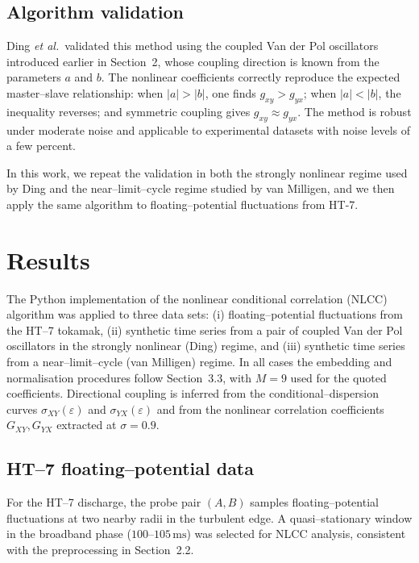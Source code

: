 \documentclass[12pt]{article}
\begin{document}
\subsection{Algorithm validation}

Ding \textit{et al.}\ validated this method using the coupled Van der Pol oscillators introduced earlier in Section~2, whose coupling direction is known from the parameters \(a\) and \(b\).  
The nonlinear coefficients correctly reproduce the expected master–slave relationship: when \(|a|>|b|\), one finds \(g_{xy}>g_{yx}\); when \(|a|<|b|\), the inequality reverses; and symmetric coupling gives \(g_{xy}\approx g_{yx}\).  
The method is robust under moderate noise and applicable to experimental datasets with noise levels of a few percent.

In this work, we repeat the validation in both the strongly nonlinear regime used by Ding and the near–limit–cycle regime studied by van Milligen, and we then apply the same algorithm to floating–potential fluctuations from HT-7.


\section{Results}

The Python implementation of the nonlinear conditional correlation (NLCC)
algorithm was applied to three data sets:
(i) floating–potential fluctuations from the HT--7 tokamak,
(ii) synthetic time series from a pair of coupled Van der Pol oscillators
in the strongly nonlinear (Ding) regime, and
(iii) synthetic time series from a near–limit–cycle (van Milligen) regime.
In all cases the embedding and normalisation procedures follow
Section~3.3, with $M=9$ used for the quoted coefficients.
Directional coupling is inferred from the conditional–dispersion curves
$\sigma_{XY}(\varepsilon)$ and $\sigma_{YX}(\varepsilon)$ and from the
nonlinear correlation coefficients $G_{XY},G_{YX}$ extracted at
$\sigma = 0.9$.

\subsection{HT--7 floating–potential data}

For the HT--7 discharge, the probe pair $(A,B)$ samples floating–potential
fluctuations at two nearby radii in the turbulent edge.
A quasi–stationary window in the broadband phase ($100$--$105\,\mathrm{ms}$)
was selected for NLCC analysis, consistent with the preprocessing in
Section~2.2.
\end{document}
